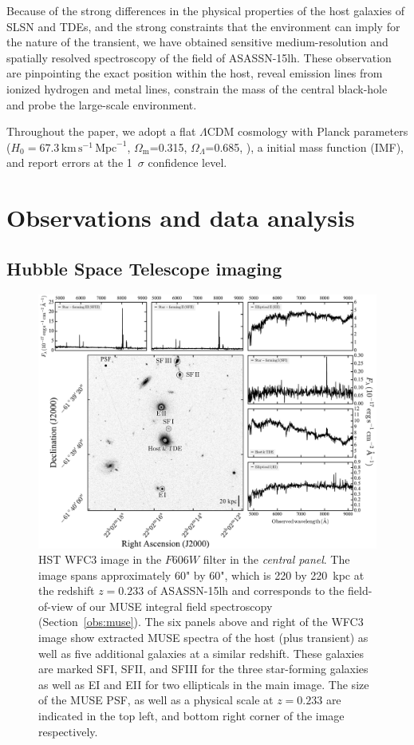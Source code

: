 \documentclass[traditabstract]{aa}
\begin{document}
Because of the strong differences in the physical properties of the host galaxies of SLSN and TDEs, and the strong constraints that the environment can imply for the nature of the transient, we have obtained sensitive medium-resolution and spatially resolved spectroscopy of the field of ASASSN-15lh. These observation are pinpointing the exact position within the host, reveal emission lines from ionized hydrogen and metal lines, constrain the mass of the central black-hole and probe the large-scale environment.

Throughout the paper, we adopt a flat $\Lambda$CDM cosmology with Planck parameters ($H_0=67.3\,\mathrm{km}\,\mathrm{s}^{-1}\,\mathrm{Mpc}^{-1}$, $\Omega_\mathrm{m}$=0.315, $\Omega_\Lambda$=0.685, \citealt{2014A&A...571A..16P}), a \citet{2003PASP..115..763C} initial mass function (IMF), and report errors at the 1~$\sigma$ confidence level.

\section{Observations and data analysis}
\label{sec:Obs}

\subsection{Hubble Space Telescope imaging}
\label{obs:hst}


\begin{figure}
  \includegraphics[width=0.999\linewidth]{fig/MUSE_ASASSN-15lh_wfc.pdf}
\caption{HST WFC3 image in the $F606W$ filter in the \textit{central panel}. The image spans approximately 60" by 60", which is 220 by 220~kpc at the redshift $z=0.233$ of ASASSN-15lh and corresponds to the field-of-view of our MUSE integral field spectroscopy (Section~\ref{obs:muse}). The six panels above and right of the WFC3 image show extracted MUSE spectra of the host (plus transient) as well as five additional galaxies at a similar redshift. These galaxies are marked SFI, SFII, and SFIII for the three star-forming galaxies as well as EI and EII for two ellipticals in the main image. The size of the MUSE PSF, as well as a physical scale at $z=0.233$ are indicated in the top left, and bottom right corner of the image respectively.}
\label{fig:fc}
\end{figure}
\end{document}
